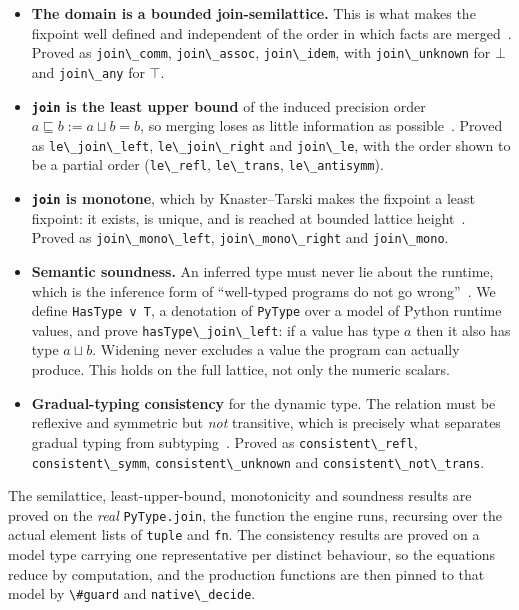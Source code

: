 \documentclass{article}
\newcommand{\code}{\lstinline}
\begin{document}
\begin{itemize}\itemsep2pt
\item \textbf{The domain is a bounded join-semilattice.} This is what makes the fixpoint well defined and independent of the order in which facts are merged~\cite{cousot1977abstract,davey2002lattices}. Proved as \code{join\_comm}, \code{join\_assoc}, \code{join\_idem}, with \code{join\_unknown} for $\bot$ and \code{join\_any} for $\top$.
\item \textbf{\code{join} is the least upper bound} of the induced precision order $a \sqsubseteq b := a \sqcup b = b$, so merging loses as little information as possible~\cite{davey2002lattices}. Proved as \code{le\_join\_left}, \code{le\_join\_right} and \code{join\_le}, with the order shown to be a partial order (\code{le\_refl}, \code{le\_trans}, \code{le\_antisymm}).
\item \textbf{\code{join} is monotone}, which by Knaster--Tarski makes the fixpoint a least fixpoint: it exists, is unique, and is reached at bounded lattice height~\cite{tarski1955fixpoint,cousot1977abstract}. Proved as \code{join\_mono\_left}, \code{join\_mono\_right} and \code{join\_mono}.
\item \textbf{Semantic soundness.} An inferred type must never lie about the runtime, which is the inference form of ``well-typed programs do not go wrong''~\cite{milner1978polymorphism,wright1994soundness}. We define \code{HasType v T}, a denotation of \code{PyType} over a model of Python runtime values, and prove \code{hasType\_join\_left}: if a value has type $a$ then it also has type $a \sqcup b$. Widening never excludes a value the program can actually produce. This holds on the full lattice, not only the numeric scalars.
\item \textbf{Gradual-typing consistency} for the dynamic type. The relation must be reflexive and symmetric but \emph{not} transitive, which is precisely what separates gradual typing from subtyping~\cite{siek2006gradual,siek2015refined}. Proved as \code{consistent\_refl}, \code{consistent\_symm}, \code{consistent\_unknown} and \code{consistent\_not\_trans}.
\end{itemize}

The semilattice, least-upper-bound, monotonicity and soundness results are proved on the \emph{real} \code{PyType.join}, the function the engine runs, recursing over the actual element lists of \code{tuple} and \code{fn}. The consistency results are proved on a model type carrying one representative per distinct behaviour, so the equations reduce by computation, and the production functions are then pinned to that model by \code{\#guard} and \code{native\_decide}.
\end{document}
